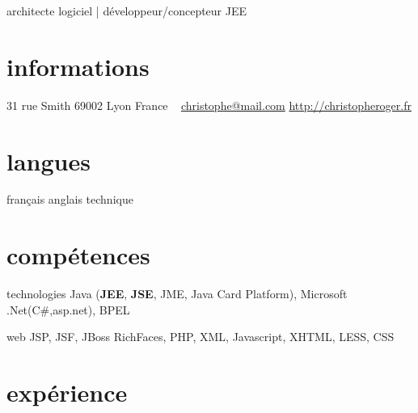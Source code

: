 \documentclass[]{roger-cv}
\begin{document}
       {architecte logiciel | développeur/concepteur JEE}


\begin{aside}
  \section{informations}
    31 rue Smith
    69002 Lyon
    France
    ~
    \href{mailto:christophe@mail.com}{christophe@mail.com}
    \href{http://christopheroger.fr}{http://christopheroger.fr}
  \section{langues}
    français
    anglais technique
\end{aside}

\section{compétences}

\begin{competenceslist}
   \competence
    {technologies}
    {Java (\textbf{JEE}, \textbf{JSE}, JME, Java Card Platform), Microsoft .Net(C\#,asp.net), BPEL }    
  
  \competence
    {web}
    {JSP, JSF, JBoss RichFaces, PHP, XML, Javascript, XHTML, LESS, CSS}

\end{competenceslist}



\section{expérience}
\end{document}
